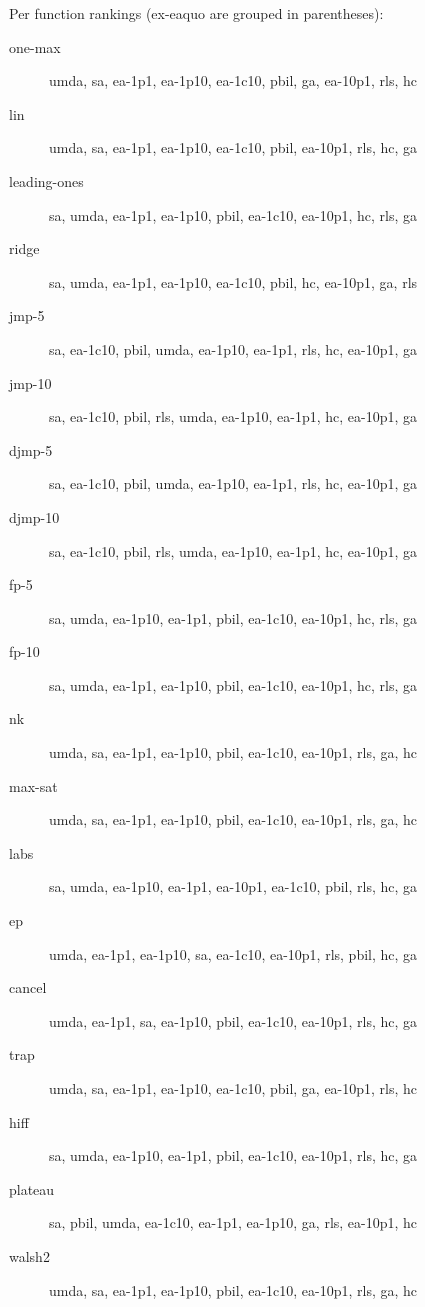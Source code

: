 Per function rankings (ex-eaquo are grouped in parentheses):
\begin{description}
\item[one-max]
umda, sa, ea-1p1, ea-1p10, ea-1c10, pbil, ga, ea-10p1, rls, hc

\item[lin]
umda, sa, ea-1p1, ea-1p10, ea-1c10, pbil, ea-10p1, rls, hc, ga

\item[leading-ones]
sa, umda, ea-1p1, ea-1p10, pbil, ea-1c10, ea-10p1, hc, rls, ga

\item[ridge]
sa, umda, ea-1p1, ea-1p10, ea-1c10, pbil, hc, ea-10p1, ga, rls

\item[jmp-5]
sa, ea-1c10, pbil, umda, ea-1p10, ea-1p1, rls, hc, ea-10p1, ga

\item[jmp-10]
sa, ea-1c10, pbil, rls, umda, ea-1p10, ea-1p1, hc, ea-10p1, ga

\item[djmp-5]
sa, ea-1c10, pbil, umda, ea-1p10, ea-1p1, rls, hc, ea-10p1, ga

\item[djmp-10]
sa, ea-1c10, pbil, rls, umda, ea-1p10, ea-1p1, hc, ea-10p1, ga

\item[fp-5]
sa, umda, ea-1p10, ea-1p1, pbil, ea-1c10, ea-10p1, hc, rls, ga

\item[fp-10]
sa, umda, ea-1p1, ea-1p10, pbil, ea-1c10, ea-10p1, hc, rls, ga

\item[nk]
umda, sa, ea-1p1, ea-1p10, pbil, ea-1c10, ea-10p1, rls, ga, hc

\item[max-sat]
umda, sa, ea-1p1, ea-1p10, pbil, ea-1c10, ea-10p1, rls, ga, hc

\item[labs]
sa, umda, ea-1p10, ea-1p1, ea-10p1, ea-1c10, pbil, rls, hc, ga

\item[ep]
umda, ea-1p1, ea-1p10, sa, ea-1c10, ea-10p1, rls, pbil, hc, ga

\item[cancel]
umda, ea-1p1, sa, ea-1p10, pbil, ea-1c10, ea-10p1, rls, hc, ga

\item[trap]
umda, sa, ea-1p1, ea-1p10, ea-1c10, pbil, ga, ea-10p1, rls, hc

\item[hiff]
sa, umda, ea-1p10, ea-1p1, pbil, ea-1c10, ea-10p1, rls, hc, ga

\item[plateau]
sa, pbil, umda, ea-1c10, ea-1p1, ea-1p10, ga, rls, ea-10p1, hc

\item[walsh2]
umda, sa, ea-1p1, ea-1p10, pbil, ea-1c10, ea-10p1, rls, ga, hc

\end{description}
